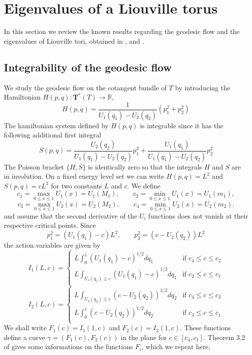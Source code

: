\documentclass[12pt]{amsart}
\numberwithin{equation}{subsection}
\theoremstyle{definition}
\theoremstyle{plain}
\begin{document}
\section{Eigenvalues of a Liouville torus}
In this section we review the known results regarding the geodesic flow and the eigenvalues of Liouville tori, obtained in \cite{2},\cite{6} and \cite{1}.
\subsection{Integrability of the geodesic flow}
\label{section21}

We study the geodesic flow on the cotangent bundle of $T$ by introducing the Hamiltonian $H(p,q) : \textbf{T}^{*}(T) \rightarrow \mathbb R$,
\[
H(p,q) = \frac{1}{U_1(q_1) - U_2(q_2)} (p_1^2 + p_2^2)
\]
The hamiltonian system defined by $H(p,q)$ is integrable since it has the following additional first integral
\[
S(p,q) = \frac{U_2(q_2)}{U_1(q_1) - U_2(q_2)}p_1^2 + \frac{U_1(q_1)}{U_1(q_1) - U_2(q_2)}p_2^2
\]
The Poisson bracket $\{H,S\}$ is identically zero so that the integrals $H$ and $S$ are in involution.
On a fixed energy level set we can write $H(p,q) = L^2$ and $S(p,q) = cL^2$ for two constants $L$ and $c$. We define
\[
c_1 = \max_{0 \leq x \leq 1} U_1(x) = U_1(M_1), \qquad c_2 = \min_{0 \leq x \leq 1} U_1(x) = U_1(m_1),
\]
\[
c_3 = \max_{0 \leq x \leq 1} U_2(x) = U_2(M_2), \qquad c_4 = \min_{0 \leq x \leq 1} U_2(x) = U_2(m_2).
\]
and assume that the second derivative of the $U_i$ functions does not vanish at their respective critical points. Since
\[
p_1^2 = (U_1(q_1) - c)L^2, \qquad p_2^2 = (c - U_2(q_2))L^2
\]
the action variables are given by
\[
I_1(L,c)=
\begin{cases}
L \int_{0}^{1} (U_1(q_1) - c)^{1/2} dq_1 & \text{if } c_4 \leq c \leq c_2\\
L \int_{U_1(q_1) \geq c} (U_1(q_1) - c)^{1/2} dq_1 & \text{if } c_2 \leq c \leq c_1\\
\end{cases}
\]
\[
I_2(L,c)=
\begin{cases}
L \int_{U_2(q_2) \leq c} (c - U_2(q_2))^{1/2} dq_2 & \text{if } c_4 \leq c \leq c_3\\
L \int_{0}^{1} (c - U_2(q_2))^{1/2} dq_2& \text{if } c_3 \leq c \leq c_1\\
\end{cases}
\]
We shall write $F_1(c) = I_1(1,c)$ and $F_2(c) = I_2(1,c)$.
These functions define a curve $\gamma = (F_1(c),F_2(c))$ in the plane for $c \in [c_4, c_1]$.
Theorem 3.2 of \cite{1} gives some informations on the functions $F_i$, which we repeat here,
\end{document}
